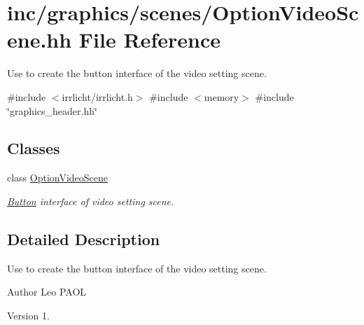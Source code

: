 \hypertarget{OptionVideoScene_8hh}{}\section{inc/graphics/scenes/\+Option\+Video\+Scene.hh File Reference}
\label{OptionVideoScene_8hh}


Use to create the button interface of the video setting scene.  


{\ttfamily \#include $<$irrlicht/irrlicht.\+h$>$}\newline
{\ttfamily \#include $<$memory$>$}\newline
{\ttfamily \#include \char`\"{}graphics\+\_\+header.\+hh\char`\"{}}\newline
\subsection*{Classes}
\begin{DoxyCompactItemize}
\item 
class \hyperlink{classOptionVideoScene}{Option\+Video\+Scene}
\begin{DoxyCompactList}\small\item\em \hyperlink{classButton}{Button} interface of video setting scene. \end{DoxyCompactList}\end{DoxyCompactItemize}


\subsection{Detailed Description}
Use to create the button interface of the video setting scene. 

\begin{DoxyAuthor}{Author}
Leo P\+A\+OL 
\end{DoxyAuthor}
\begin{DoxyVersion}{Version}
1. 
\end{DoxyVersion}
